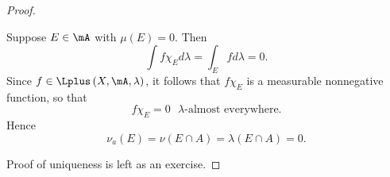 \documentclass[pmath451]{subfiles}
\begin{document}
\begin{proof}
\begin{claim}
            Suppose $E\in\mA$ with $\mu\left( E \right) = 0$. Then
            \begin{equation*}
                \int f\chi_E d\lambda = \int_Efd\lambda = 0.
            \end{equation*}
            Since $f\in\Lplus\left( X,\mA,\lambda \right)$, it follows that $f\chi_E$ is a measurable nonnegative function, so that
            \begin{equation*}
                f\chi_E = 0 \text{ $\lambda$-almost everywhere}.
            \end{equation*}
            Hence
            \begin{equation*}
                \nu_a\left( E \right) = \nu\left( E\cap A \right) = \lambda\left( E\cap A \right) = 0.
            \end{equation*}
        \end{claim}

        Proof of uniqueness is left as an exercise.
    \end{proof}
    
    
    
    
    
    
    
    
    
    
    
    
    
    
    
    
    
    
    
    
    
    
    
    
    
    
    
    
    
    
    
    
    
    
    
    
    
\end{document}
